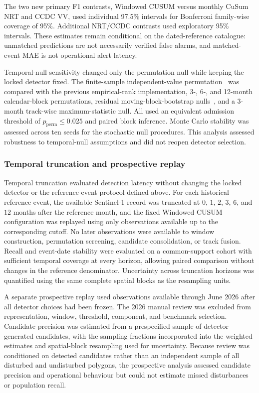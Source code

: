 The two new primary F1 contrasts, Windowed CUSUM versus monthly CuSum NRT and CCDC VV, used individual 97.5\% intervals for Bonferroni family-wise coverage of 95\%. Additional NRT/CCDC contrasts used exploratory 95\% intervals. These estimates remain conditional on the dated-reference catalogue: unmatched predictions are not necessarily verified false alarms, and matched-event MAE is not operational alert latency.

Temporal-null sensitivity changed only the permutation null while keeping the locked detector fixed. The finite-sample independent-value permutation~\citep{PhipsonSmyth2010Permutation} was compared with the previous empirical-rank implementation, 3-, 6-, and 12-month calendar-block permutations, residual moving-block-bootstrap nulls~\citep{Kunsch1989BlockBootstrap}, and a 3-month track-wise maximum-statistic null. All used an equivalent admission threshold of $p_{\mathrm{perm}}\le0.025$ and paired block inference. Monte Carlo stability was assessed across ten seeds for the stochastic null procedures. This analysis assessed robustness to temporal-null assumptions and did not reopen detector selection.








\subsubsection{Temporal truncation and prospective replay}
\label{sec:temporal_prospective}

Temporal truncation evaluated detection latency without changing the locked detector or the reference-event protocol defined above. For each historical reference event, the available Sentinel-1 record was truncated at $0$, $1$, $2$, $3$, $6$, and $12$ months after the reference month, and the fixed Windowed CUSUM configuration was replayed using only observations available up to the corresponding cutoff. No later observations were available to window construction, permutation screening, candidate consolidation, or track fusion. Recall and event-date stability were evaluated on a common-support cohort with sufficient temporal coverage at every horizon, allowing paired comparison without changes in the reference denominator. Uncertainty across truncation horizons was quantified using the same complete spatial blocks as the resampling units.

A separate prospective replay used observations available through June 2026 after all detector choices had been frozen. The 2026 manual review was excluded from representation, window, threshold, component, and benchmark selection. Candidate precision was estimated from a prespecified sample of detector-generated candidates, with the sampling fractions incorporated into the weighted estimates and spatial-block resampling used for uncertainty. Because review was conditioned on detected candidates rather than an independent sample of all disturbed and undisturbed polygons, the prospective analysis assessed candidate precision and operational behaviour but could not estimate missed disturbances or population recall.


